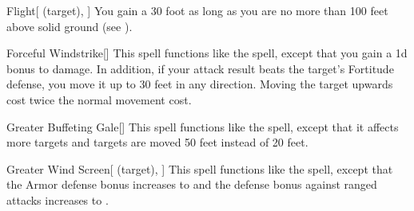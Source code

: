 \lowercase{\hypertarget{spell:Flight}{}}\label{spell:Flight}
\begin{attuneability}[\nth{4}]{\hypertarget{spell:Flight}{Flight}}[ (target), ]
You gain a 30 foot  as long as you are no more than 100 feet above solid ground (see ).
\end{attuneability}
\vspace{0.25em}



\lowercase{\hypertarget{spell:Forceful Windstrike}{}}\label{spell:Forceful Windstrike}
\begin{freeability}[\nth{4}]{\hypertarget{spell:Forceful Windstrike}{Forceful Windstrike}}[]
This spell functions like the  spell, except that you gain a \plus1d bonus to damage.
In addition, if your attack result beats the target's Fortitude defense, you move it up to 30 feet in any direction.
Moving the target upwards cost twice the normal movement cost.
\end{freeability}
\vspace{0.25em}



\lowercase{\hypertarget{spell:Greater Buffeting Gale}{}}\label{spell:Greater Buffeting Gale}
\begin{freeability}[\nth{4}]{\hypertarget{spell:Greater Buffeting Gale}{Greater Buffeting Gale}}[]
This spell functions like the  spell, except that it affects more targets and targets are moved 50 feet instead of 20 feet.
\end{freeability}
\vspace{0.25em}



\lowercase{\hypertarget{spell:Greater Wind Screen}{}}\label{spell:Greater Wind Screen}
\begin{attuneability}[\nth{4}]{\hypertarget{spell:Greater Wind Screen}{Greater Wind Screen}}[ (target), ]
This spell functions like the  spell, except that the Armor defense bonus increases to  and the defense bonus against ranged attacks increases to .
\end{attuneability}
\vspace{0.25em}



